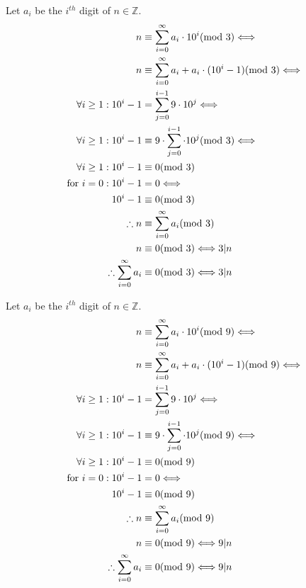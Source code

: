 \documentclass[10pt,\jkfside,a4paper]{article}
\begin{document}
\begin{enumerate}
\begin{center}
Let $a_i$ be the $i^{th}$ digit of $n \in \mathbb{Z}$.
\begin{equation}
\begin{split}
n &\equiv \sum^\infty_{i=0}a_i\cdot 10^i (\text{mod } 3) \Longleftrightarrow\\
n &\equiv \sum^\infty_{i=0}a_i + a_i\cdot(10^i - 1) (\text{mod } 3) \Longleftrightarrow\\
\vspace{0.5em}
\forall i \geq 1: 10^i - 1 &= \sum^{i-1}_{j=0}9\cdot 10^j\Longleftrightarrow\\
\forall i \geq 1: 10^i - 1 &\equiv 9\cdot \sum^{i-1}_{j=0}\cdot 10^j (\text{mod } 3)\Longleftrightarrow\\
\forall i \geq 1: 10^i - 1 &\equiv 0 (\text{mod } 3)\\
\text{for } i = 0: 10^i - 1 &= 0 \Longleftrightarrow\\
10^i - 1 &\equiv 0 (\text{mod } 3)\\
\vspace{0.5em}
\therefore n &\equiv \sum^\infty_{i=0}a_i (\text{mod } 3)\\
n &\equiv 0 (\text{mod } 3) \Longleftrightarrow 3|n\\
\therefore \sum^\infty_{i=0}a_i& \equiv 0 (\text{mod } 3) \Longleftrightarrow 3|n
\end{split}
\end{equation}

Let $a_i$ be the $i^{th}$ digit of $n \in \mathbb{Z}$.
\begin{equation}
\begin{split}
n &\equiv \sum^\infty_{i=0}a_i\cdot 10^i (\text{mod } 9) \Longleftrightarrow\\
n &\equiv \sum^\infty_{i=0}a_i + a_i\cdot(10^i - 1) (\text{mod } 9) \Longleftrightarrow\\
\vspace{0.5em}
\forall i \geq 1: 10^i - 1 &= \sum^{i-1}_{j=0}9\cdot 10^j\Longleftrightarrow\\
\forall i \geq 1: 10^i - 1 &\equiv 9\cdot \sum^{i-1}_{j=0}\cdot 10^j (\text{mod } 9)\Longleftrightarrow\\
\forall i \geq 1: 10^i - 1 &\equiv 0 (\text{mod } 9)\\
\text{for } i = 0: 10^i - 1 &= 0 \Longleftrightarrow\\
10^i - 1 &\equiv 0 (\text{mod } 9)\\
\vspace{0.5em}
\therefore n &\equiv \sum^\infty_{i=0}a_i (\text{mod } 9)\\
n &\equiv 0 (\text{mod } 9) \Longleftrightarrow 9|n\\
\therefore \sum^\infty_{i=0}a_i& \equiv 0 (\text{mod } 9) \Longleftrightarrow 9|n
\end{split}
\end{equation}


\end{center}
\end{enumerate}
\end{document}
